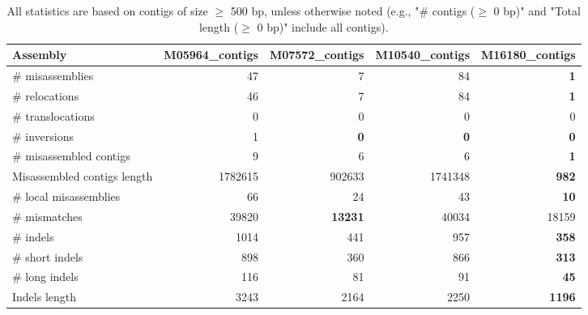 \documentclass[12pt,a4paper]{article}
\begin{document}
\begin{table}[ht]
\begin{center}
\caption{All statistics are based on contigs of size $\geq$ 500 bp, unless otherwise noted (e.g., "\# contigs ($\geq$ 0 bp)" and "Total length ($\geq$ 0 bp)" include all contigs).}
\begin{tabular}{|l*{4}{|r}|}
\hline
Assembly & M05964\_contigs & M07572\_contigs & M10540\_contigs & M16180\_contigs \\ \hline
\# misassemblies & 47 & 7 & 84 & {\bf 1} \\ \hline
\hspace{5mm}\# relocations & 46 & 7 & 84 & {\bf 1} \\ \hline
\hspace{5mm}\# translocations & 0 & 0 & 0 & 0 \\ \hline
\hspace{5mm}\# inversions & 1 & {\bf 0} & {\bf 0} & {\bf 0} \\ \hline
\# misassembled contigs & 9 & 6 & 6 & {\bf 1} \\ \hline
Misassembled contigs length & 1782615 & 902633 & 1741348 & {\bf 982} \\ \hline
\# local misassemblies & 66 & 24 & 43 & {\bf 10} \\ \hline
\# mismatches & 39820 & {\bf 13231} & 40034 & 18159 \\ \hline
\# indels & 1014 & 441 & 957 & {\bf 358} \\ \hline
\hspace{5mm}\# short indels & 898 & 360 & 866 & {\bf 313} \\ \hline
\hspace{5mm}\# long indels & 116 & 81 & 91 & {\bf 45} \\ \hline
Indels length & 3243 & 2164 & 2250 & {\bf 1196} \\ \hline
\end{tabular}
\end{center}
\end{table}
\end{document}
